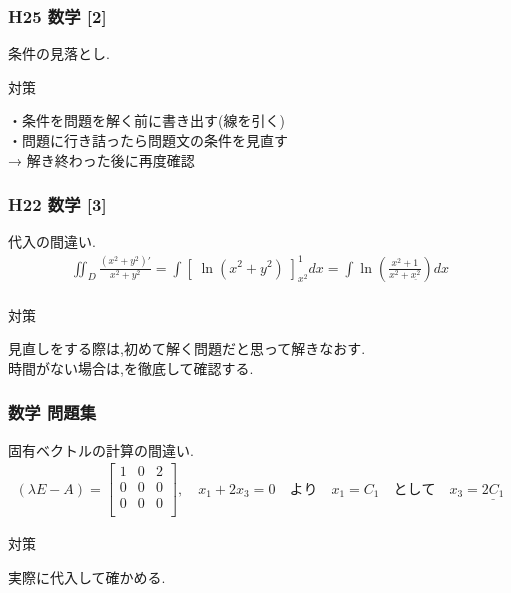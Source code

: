 \documentclass[a4paper]{jsarticle}
\begin{document}
\subsubsection{H25 数学 [2]}
条件の見落とし.
\begin{itembox}[l]{対策}
    \begin{center}
        ・条件を問題を解く前に書き出す(線を引く)\\
        ・問題に行き詰ったら問題文の条件を見直す\\
        → 解き終わった後に再度確認
    \end{center}
\end{itembox}
\subsubsection{H22 数学 [3]}
代入の間違い.
\begin{eqnarray*}
    \iint _D \frac{\left(x^2 + y^2 \right)'}{x^2+y^2}
    = \int \left[\;\ln \left(x^2+y^2\right)\;\right]^1_{x^2} dx
    = \int \ln \left(\frac{x^2 + 1}{x^2 + \underline{x^2}}\right) dx\\
\end{eqnarray*}
\begin{itembox}[l]{対策}
    \begin{center}
        見直しをする際は,初めて解く問題だと思って解きなおす.\\
        時間がない場合は,を徹底して確認する.
    \end{center}
\end{itembox}
\subsubsection{数学 問題集}
固有ベクトルの計算の間違い.
\begin{eqnarray*}
    \left(\lambda E - A\right)=
    \begin{bmatrix}
        1 & 0 & 2 \\
        0 & 0 & 0 \\
        0 & 0 & 0 \\
    \end{bmatrix} ,\quad
    x_1 + 2x_3 =0 \quad より \quad
    x_1=C_1\quad として \quad x_3 = \underline{2C_1}
\end{eqnarray*}
\begin{itembox}[l]{対策}
    \begin{center}
        実際に代入して確かめる.
    \end{center}
\end{itembox}
\newpage
\end{document}
